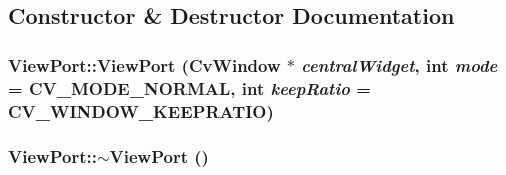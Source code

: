 \subsection{Constructor \& Destructor Documentation}
\hypertarget{classViewPort_ae986eca6567919eccfa84fa11d152519}{
\subsubsection[{ViewPort}]{\setlength{\rightskip}{0pt plus 5cm}ViewPort::ViewPort ({\bf CvWindow} $\ast$ {\em centralWidget}, \/  int {\em mode} = {\ttfamily CV\_\-MODE\_\-NORMAL}, \/  int {\em keepRatio} = {\ttfamily CV\_\-WINDOW\_\-KEEPRATIO})}}
\label{classViewPort_ae986eca6567919eccfa84fa11d152519}
\hypertarget{classViewPort_aa9e30578206a4c74b8e3e0bf1cbed5a1}{
\subsubsection[{$\sim$ViewPort}]{\setlength{\rightskip}{0pt plus 5cm}ViewPort::$\sim$ViewPort ()}}
\label{classViewPort_aa9e30578206a4c74b8e3e0bf1cbed5a1}



